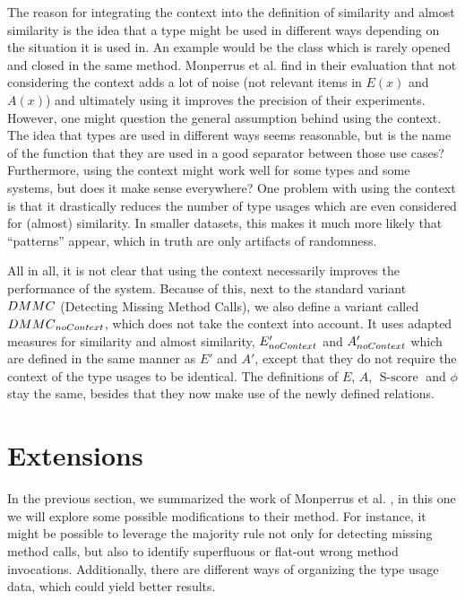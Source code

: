 The reason for integrating the context into the definition of similarity and almost similarity is the idea that a type might be used in different ways depending on the situation it is used in.
An example would be the class  which is rarely opened and closed in the same method.
Monperrus et al. \cite{monperrus2013detecting} find in their evaluation that not considering the context adds a lot of noise (not relevant items in $E(x)$ and $A(x)$) and ultimately using it improves the precision of their experiments.
However, one might question the general assumption behind using the context.
The idea that types are used in different ways seems reasonable, but is the name of the function that they are used in a good separator between those use cases?
Furthermore, using the context might work well for some types and some systems, but does it make sense everywhere?
One problem with using the context is that it drastically reduces the number of type usages which are even considered for (almost) similarity.
In smaller datasets, this makes it much more likely that ``patterns'' appear, which in truth are only artifacts of randomness.

All in all, it is not clear that using the context necessarily improves the performance of the system.
Because of this, next to the standard variant $\mathnormal{DMMC}$ (Detecting Missing Method Calls), we also define a variant called $\mathnormal{DMMC}_{\mathnormal{noContext}}$, which does not take the context into account.
It uses adapted measures for similarity and almost similarity, $E'_{\mathnormal{noContext}}$ and $A'_{\mathnormal{noContext}}$ which are defined in the same manner as $E'$ and $A'$, except that they do not require the context of the type usages to be identical.
The definitions of $E$, $A$, $\operatorname{S-score}$ and $\phi$ stay the same, besides that they now make use of the newly defined relations.

\section{Extensions}

In the previous section, we summarized the work of Monperrus et al. \cite{monperrus2010detecting}\cite{monperrus2013detecting}, in this one we will explore some possible modifications to their method.
For instance, it might be possible to leverage the majority rule not only for detecting missing method calls, but also to identify superfluous or flat-out wrong method invocations.
Additionally, there are different ways of organizing the type usage data, which could yield better results.

